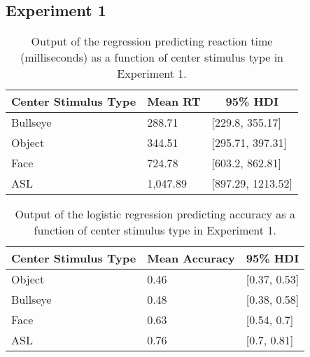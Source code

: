 \documentclass[,man,floatsintext]{apa6}
\begin{document}
\begin{appendix}
\section{Experiment 1}\label{experiment-1}

\begin{table}[h]
\begin{center}
\begin{threeparttable}
\caption{\label{tab:trio-rt-model}Output of the regression predicting reaction time (milliseconds) as a function of center stimulus type in Experiment 1.}
\begin{tabular}{lll}
\toprule
Center Stimulus Type & \multicolumn{1}{c}{Mean RT} & \multicolumn{1}{c}{95\% HDI}\\
\midrule
Bullseye & 288.71 & [229.8, 355.17]\\
Object & 344.51 & [295.71, 397.31]\\
Face & 724.78 & [603.2, 862.81]\\
ASL & 1,047.89 & [897.29, 1213.52]\\
\bottomrule
\end{tabular}
\end{threeparttable}
\end{center}
\end{table}

\begin{table}[h]
\begin{center}
\begin{threeparttable}
\caption{\label{tab:trio-acc-model}Output of the logistic regression predicting accuracy as a function of center stimulus type in Experiment 1.}
\begin{tabular}{lll}
\toprule
Center Stimulus Type & \multicolumn{1}{c}{Mean Accuracy} & \multicolumn{1}{c}{95\% HDI}\\
\midrule
Object & 0.46 & [0.37, 0.53]\\
Bullseye & 0.48 & [0.38, 0.58]\\
Face & 0.63 & [0.54, 0.7]\\
ASL & 0.76 & [0.7, 0.81]\\
\bottomrule
\end{tabular}
\end{threeparttable}
\end{center}
\end{table}


\end{appendix}
\end{document}
